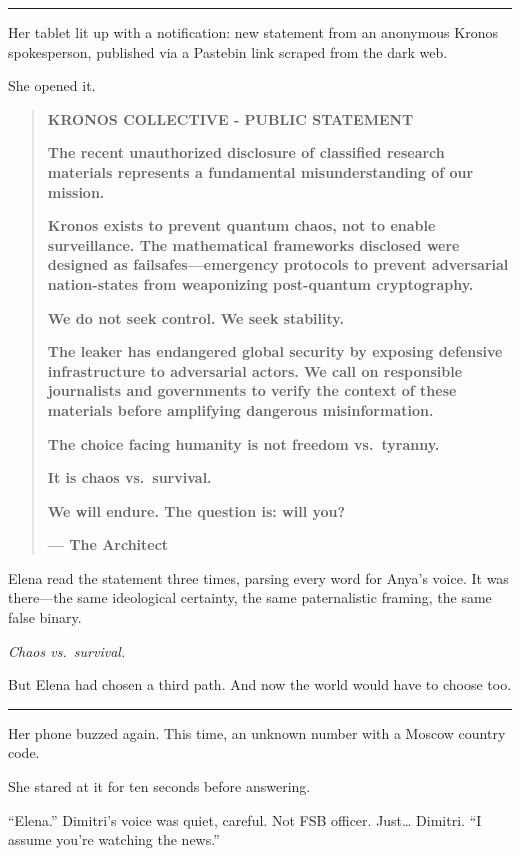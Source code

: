 \documentclass[12pt,letterpaper]{book}
\begin{document}
\begin{center}\rule{0.5\linewidth}{0.5pt}\end{center}

Her tablet lit up with a notification: new statement from an anonymous Kronos spokesperson, published via a Pastebin link scraped from the dark web.

She opened it.

\begin{quote}
\textbf{KRONOS COLLECTIVE - PUBLIC STATEMENT}

\textbf{The recent unauthorized disclosure of classified research materials represents a fundamental misunderstanding of our mission.}

\textbf{Kronos exists to prevent quantum chaos, not to enable surveillance. The mathematical frameworks disclosed were designed as failsafes---emergency protocols to prevent adversarial nation-states from weaponizing post-quantum cryptography.}

\textbf{We do not seek control. We seek stability.}

\textbf{The leaker has endangered global security by exposing defensive infrastructure to adversarial actors. We call on responsible journalists and governments to verify the context of these materials before amplifying dangerous misinformation.}

\textbf{The choice facing humanity is not freedom vs.~tyranny.}

\textbf{It is chaos vs.~survival.}

\textbf{We will endure. The question is: will you?}

\textbf{--- The Architect}
\end{quote}

Elena read the statement three times, parsing every word for Anya's voice. It was there---the same ideological certainty, the same paternalistic framing, the same false binary.

\emph{Chaos vs.~survival.}

But Elena had chosen a third path. And now the world would have to choose too.

\begin{center}\rule{0.5\linewidth}{0.5pt}\end{center}

Her phone buzzed again. This time, an unknown number with a Moscow country code.

She stared at it for ten seconds before answering.

``Elena.'' Dimitri's voice was quiet, careful. Not FSB officer. Just\ldots{} Dimitri. ``I assume you're watching the news.''
\end{document}
